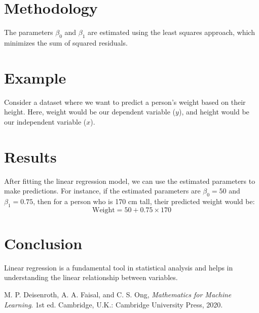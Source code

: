 \documentclass[12pt,openany]{book}
\theoremstyle{definition}
\begin{document}
	\begin{center}
	\end{center}
	
	\section{Methodology}
	The parameters $\beta_0$ and $\beta_1$ are estimated using the least squares approach, which minimizes the sum of squared residuals.
	
	\section{Example}
	Consider a dataset where we want to predict a person's weight based on their height. Here, weight would be our dependent variable ($y$), and height would be our independent variable ($x$).
	
	\section{Results}
	After fitting the linear regression model, we can use the estimated parameters to make predictions. For instance, if the estimated parameters are $\beta_0 = 50$ and $\beta_1 = 0.75$, then for a person who is 170 cm tall, their predicted weight would be:
	\begin{equation}
		\text{Weight} = 50 + 0.75 \times 170
	\end{equation}
	
	\section{Conclusion}
	Linear regression is a fundamental tool in statistical analysis and helps in understanding the linear relationship between variables.
	

	\begin{thebibliography}{9}
		M. P. Deisenroth, A. A. Faisal, and C. S. Ong, \textit{Mathematics for Machine Learning}. 1st ed. Cambridge, U.K.: Cambridge University Press, 2020.
	\end{thebibliography}
\end{document}
